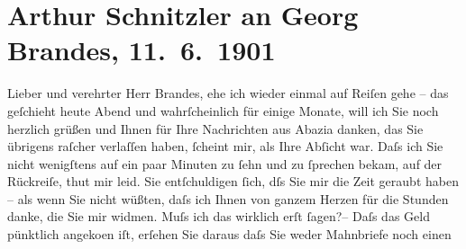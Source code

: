 

         
         \renewcommand{\erwaehntePersonen}{Personen: Richard Beer-Hofmann, Georg Brandes, Fjodor Mihajlovič Dostojevskij, Édouard Dujardin}
         \renewcommand{\erwaehnteOrte}{Orte: Hotel Guarnero, Salzburg, Villa Arnstein, Wien, Wörthersee}
         \renewcommand{\erwaehnteWerke}{Werke: Der einsame Weg. Schauspiel in fünf Akten, Die Sanfte, Les lauriers sont coupés, Lieutenant Gustl. Novelle}
               \section[Arthur Schnitzler an Georg Brandes, 11. 6. 1901]{ Arthur Schnitzler an Georg Brandes, 11. 6. 1901}\nopagebreak{}\rehead{ }\begin{ledgroupsized}[t]{13cm}\normalsize\beginnumbering \toendnotes[C]{\smallbreak\pagebreak[2]} 
\toendnotes[C]{\smallbreak}\pstart{}{\pb}Lieber und verehrter Herr Brandes,\pend\pstart
           ehe ich wieder einmal auf Reiſen gehe – das geſchieht heute Abend und wahrſcheinlich
               für einige Monate, will ich Sie noch herzlich grüßen und Ihnen für Ihre Nachrichten
               aus Abazia danken, das Sie übrigens raſcher
               verlaſſen haben, ſcheint mir, als Ihre Abſicht war. Daſs ich Sie {\pb}nicht wenigſtens auf ein paar Minuten zu ſehn und
               zu ſprechen bekam, auf der Rückreiſe, thut mir leid. Sie entſchuldigen ſich, dſs Sie
               mir die Zeit geraubt haben – als wenn Sie nicht wüßten, daſs ich Ihnen von ganzem
               Herzen für die Stunden danke, die Sie mir widmen. Muſs ich das wirklich erſt ſagen?–
               Daſs das Geld pünktlich angeko{\geminationm}en iſt, erſehen Sie
               daraus {\pb}daſs Sie weder Mahnbriefe noch einen

\end{ledgroupsized}
